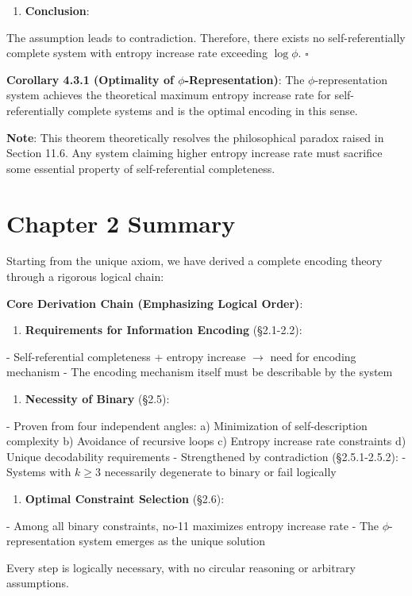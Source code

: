 \begin{enumerate}
\item \textbf{Conclusion}:
\end{enumerate}
   The assumption leads to contradiction. Therefore, there exists no self-referentially complete system with entropy increase rate exceeding $\log \phi$. $\square$

\textbf{Corollary 4.3.1 (Optimality of $\phi$-Representation)}:
\label{thm:2.11}
The $\phi$-representation system achieves the theoretical maximum entropy increase rate for self-referentially complete systems and is the optimal encoding in this sense.

\textbf{Note}:
This theorem theoretically resolves the philosophical paradox raised in Section 11.6. Any system claiming higher entropy increase rate must sacrifice some essential property of self-referential completeness.

\section{Chapter 2 Summary}
\label{sec:ch04_encoding:chapter-2-summary}

Starting from the unique axiom, we have derived a complete encoding theory through a rigorous logical chain:

\textbf{Core Derivation Chain (Emphasizing Logical Order)}:

\begin{enumerate}
\item \textbf{Requirements for Information Encoding} (\S2.1-2.2):
\end{enumerate}
   - Self-referential completeness + entropy increase $\rightarrow$ need for encoding mechanism
   - The encoding mechanism itself must be describable by the system

\begin{enumerate}
\item \textbf{Necessity of Binary} (\S2.5):
\end{enumerate}
   - Proven from four independent angles:
     a) Minimization of self-description complexity
     b) Avoidance of recursive loops
     c) Entropy increase rate constraints
     d) Unique decodability requirements
   - Strengthened by contradiction (\S2.5.1-2.5.2):
     - Systems with $k \geq 3$ necessarily degenerate to binary or fail logically

\begin{enumerate}
\item \textbf{Optimal Constraint Selection} (\S2.6):
\end{enumerate}
   - Among all binary constraints, no-11 maximizes entropy increase rate
   - The $\phi$-representation system emerges as the unique solution

Every step is logically necessary, with no circular reasoning or arbitrary assumptions.

